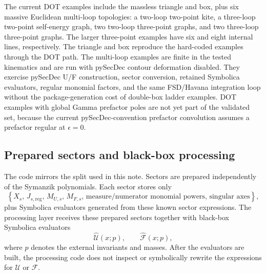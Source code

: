 \documentclass[11pt]{article}
\newcommand{\eps}{\epsilon}
\newcommand{\U}{\mathcal U}
\newcommand{\F}{\mathcal F}
\newcommand{\hU}{\widehat{\mathcal U}}
\newcommand{\hF}{\widehat{\mathcal F}}
\begin{document}
The current DOT examples include the massless triangle and box, plus six
massive Euclidean multi-loop topologies: a two-loop two-point kite, a
three-loop two-point self-energy graph, two two-loop three-point graphs, and
two three-loop three-point graphs.  The larger three-point examples have six
and eight internal lines, respectively.  The triangle and box reproduce the
hard-coded examples through the DOT path.  The multi-loop examples are finite
in the tested kinematics and are run with pySecDec contour deformation
disabled.  They exercise pySecDec U/F construction, sector conversion,
retained Symbolica evaluators, regular monomial factors, and the same
FSD/Havana integration loop without the package-generation cost of double-box
ladder examples.  DOT examples with global Gamma prefactor poles are not yet
part of the validated set, because the current pySecDec-convention prefactor
convolution assumes a prefactor regular at \(\eps=0\).

\subsection{Prepared sectors and black-box processing}

The code mirrors the split used in this note.  Sectors are prepared
independently of the Symanzik polynomials.  Each sector stores only
\begin{equation}
  \left\{
    X_s,\,
    J_{s,\mathrm{reg}},\,
    M_{U,s},\,
    M_{F,s},\,
    \text{measure/numerator monomial powers},\,
    \text{singular axes}
  \right\},
\end{equation}
plus Symbolica evaluators generated from these known sector expressions.  The
processing layer receives these prepared sectors together with black-box
Symbolica evaluators
\begin{equation}
  \hU(x;p),
  \qquad
  \hF(x;p),
\end{equation}
where \(p\) denotes the external invariants and masses.  After the evaluators
are built, the processing code does not inspect or symbolically rewrite the
expressions for \(\U\) or \(\F\).
\end{document}
